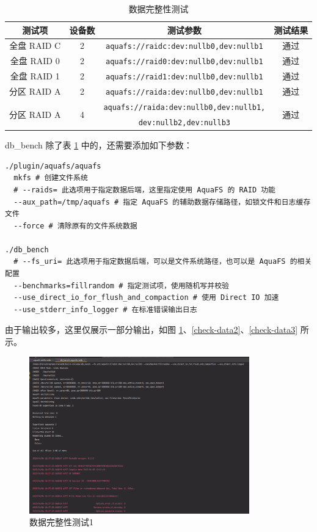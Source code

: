 \begin{table}[htbp]
  \centering
  \caption{数据完整性测试}
  \label{test-data}
  \begin{tabular}{cccc}
    \hline
    \textbf{测试项} & \textbf{设备数} & \textbf{测试参数} & \textbf{测试结果} \\
    \hline
    全盘 RAID C & 2 & \verb|aquafs://raidc:dev:nullb0,dev:nullb1| & 通过 \\
    全盘 RAID 0 & 2 & \verb|aquafs://raid0:dev:nullb0,dev:nullb1| & 通过 \\
    全盘 RAID 1 & 2 & \verb|aquafs://raid1:dev:nullb0,dev:nullb1| & 通过 \\
    分区 RAID A & 2 & \verb|aquafs://raida:dev:nullb0,dev:nullb1| & 通过 \\
    \multirow{2}{*}{分区 RAID A} & \multirow{2}{*}{4} & \verb|aquafs://raida:dev:nullb0,dev:nullb1,| & \multirow{2}{*}{通过} \\
    & & \verb|dev:nullb2,dev:nullb3| & \\
    \hline
  \end{tabular}
\end{table}

db\_bench 除了表 \ref{test-data} 中的，还需要添加如下参数：

\begin{lstlisting}
./plugin/aquafs/aquafs
  mkfs # 创建文件系统
  # --raids= 此选项用于指定数据后端，这里指定使用 AquaFS 的 RAID 功能
  --aux_path=/tmp/aquafs # 指定 AquaFS 的辅助数据存储路径，如锁文件和日志缓存文件
  --force # 清除原有的文件系统数据

./db_bench 
  # --fs_uri= 此选项用于指定数据后端，可以是文件系统路径，也可以是 AquaFS 的相关配置
  --benchmarks=fillrandom # 指定测试项，使用随机写并校验
  --use_direct_io_for_flush_and_compaction # 使用 Direct IO 加速
  --use_stderr_info_logger # 在标准错误输出日志
\end{lstlisting}

由于输出较多，这里仅展示一部分输出，如图 \ref{check-data1}、\ref{check-data2}、\ref{check-data3} 所示。

\begin{figure}[htbp]
  \centering
  \includegraphics[width=0.85\textwidth]{fig/raid-data-check1}
  \caption{ 数据完整性测试1 }
  \label{check-data1}
\end{figure}

